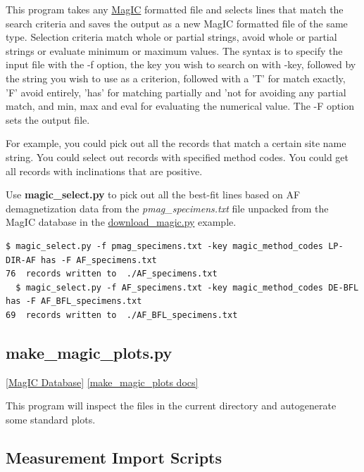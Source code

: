 \documentclass[11pt]{book}
\begin{document}
{{This program takes any \href{#MagIC}{MagIC} formatted file and selects lines that match the search criteria and saves the output as a new MagIC formatted file of the same type.  Selection criteria match whole or partial strings, avoid whole or partial strings or evaluate minimum or maximum values.    The syntax is to specify the input file with the -f option, the key you wish to search on with -key, followed by the string you wish to use as a criterion, followed with a 'T' for match exactly, 'F' avoid entirely, 'has' for matching partially and 'not for avoiding any partial match, and min, max and eval for evaluating the numerical value.  The -F option sets the output file.

  For example, you could pick out all the records that match a certain site name string.  You could select out records with specified method codes.  You could get all records with inclinations that are positive.

  Use {\bf magic\_select.py} to pick out all the best-fit lines based on AF demagnetization data from the {\it pmag\_specimens.txt} file unpacked from the MagIC database in the \href{#download_magic.py}{download\_magic.py} example.

  \begin{verbatim}
$ magic_select.py -f pmag_specimens.txt -key magic_method_codes LP-DIR-AF has -F AF_specimens.txt
76  records written to  ./AF_specimens.txt
  $ magic_select.py -f AF_specimens.txt -key magic_method_codes DE-BFL has -F AF_BFL_specimens.txt
69  records written to  ./AF_BFL_specimens.txt

 \end{verbatim}

\subsection{make\_magic\_plots.py}
\href{#MagICDatabase}{[MagIC Database]}
\href{https://github.com/PmagPy/PmagPy/blob/master/programs/make_magic_plots.py}{[make\_magic\_plots docs]}

This program will inspect the files in the current directory and autogenerate some standard plots.

\subsection{Measurement Import Scripts}


}}
\end{document}
